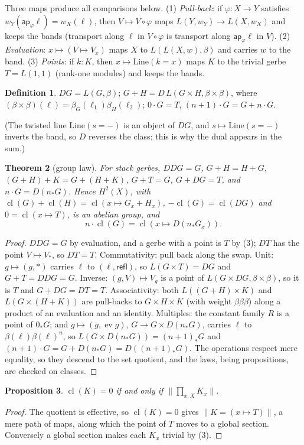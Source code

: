 \documentclass[11pt]{amsart}
\newtheorem{theorem}{Theorem}[section]
\newtheorem{proposition}[theorem]{Proposition}
\theoremstyle{definition}
\newtheorem{definition}[theorem]{Definition}
\theoremstyle{remark}
\newcommand{\cl}{\operatorname{cl}}
\newcommand{\ev}{\operatorname{ev}}
\newcommand{\tr}[1]{\|#1\|}
\newcommand{\ap}{\mathsf{ap}}
\begin{document}
Three maps produce all comparisons below.
(1) \emph{Pull-back}: if $\varphi:X\to Y$ satisfies
$w_Y(\ap_\varphi\ell)=w_X(\ell)$, then $V\mapsto V\circ\varphi$ maps
$L(Y,w_Y)\to L(X,w_X)$ and keeps the bands (transport along $\ell$ in
$V\circ\varphi$ is transport along $\ap_\varphi\ell$ in $V$).
(2) \emph{Evaluation}: $x\mapsto(V\mapsto V_x)$ maps $X$ to
$L(L(X,w),\beta)$ and carries $w$ to the band.
(3) \emph{Points}: if $k:K$, then $x\mapsto\mathrm{Line}(k=x)$ maps $K$ to
the trivial gerbe $T=L(1,1)$ (rank-one modules) and keeps the bands.

\begin{definition}
$DG=L(G,\beta)$; $G+H=D\,L(G\times H,\beta\times\beta)$, where
$(\beta\times\beta)(\ell)=\beta_G(\ell_1)\beta_H(\ell_2)$; $0\cdot G=T$,
$(n+1)\cdot G=G+n\cdot G$.
\end{definition}

(The twisted line $\mathrm{Line}(s=-)$ is an object of $DG$, and
$s\mapsto\mathrm{Line}(s=-)$ inverts the band, so $D$ reverses the class;
this is why the dual appears in the sum.)

\begin{theorem}[group law]\label{t:group}
For stack gerbes, $DDG=G$, $G+H=H+G$, $(G+H)+K=G+(H+K)$, $G+T=G$,
$G+DG=T$, and $n\cdot G=D(n_*G)$. Hence $H^2(X)$, with
$\cl(G)+\cl(H)=\cl(x\mapsto G_x+H_x)$, $-\cl(G)=\cl(DG)$ and
$0=\cl(x\mapsto T)$, is an abelian group, and
\[n\cdot\cl(G)=\cl(x\mapsto D(n_*G_x)).\]
\end{theorem}
\begin{proof}
$DDG=G$ by evaluation, and a gerbe with a point is $T$ by (3); $DT$ has the
point $V\mapsto V_\ast$, so $DT=T$. Commutativity: pull back along the swap.
Unit: $g\mapsto(g,\ast)$ carries $\ell$ to $(\ell,\mathsf{refl})$, so
$L(G\times T)=DG$ and $G+T=DDG=G$. Inverse: $(g,V)\mapsto V_g$ is a point of
$L(G\times DG,\beta\times\beta)$, so it is $T$ and $G+DG=DT=T$.
Associativity: both $L((G+H)\times K)$ and $L(G\times(H+K))$ are pull-backs
to $G\times H\times K$ (with weight $\beta\beta\beta$) along a product of an
evaluation and an identity. Multiples: the constant family $R$ is a point of
$0_*G$; and $g\mapsto(g,\ev g)$, $G\to G\times D(n_*G)$, carries $\ell$ to
$\beta(\ell)\beta(\ell)^n$, so $L(G\times D(n_*G))=(n+1)_*G$ and
$(n+1)\cdot G=G+D(n_*G)=D((n+1)_*G)$. The operations respect mere equality,
so they descend to the set quotient, and the laws, being propositions, are
checked on classes.
\end{proof}

\begin{proposition}\label{p:zero}
$\cl(K)=0$ if and only if $\tr{\prod_{x:X}K_x}$.
\end{proposition}
\begin{proof}
The quotient is effective, so $\cl(K)=0$ gives $\tr{K=(x\mapsto T)}$, a
mere path of maps, along which the point of $T$ moves to a global section.
Conversely a global section makes each $K_x$ trivial by (3).
\end{proof}
\end{document}
